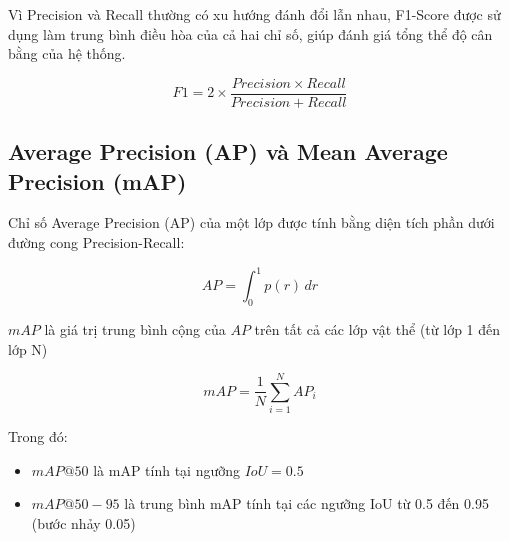 Vì Precision và Recall thường có xu hướng đánh đổi lẫn nhau, F1-Score được sử dụng làm trung bình điều hòa của cả hai chỉ số, giúp đánh giá tổng thể độ cân bằng của hệ thống.

\begin{equation}
	F1 = 2 \times \frac{Precision \times Recall} {Precision + Recall}
\end{equation}

\subsection{Average Precision (AP) và Mean Average Precision (mAP)}

Chỉ số Average Precision (AP) của một lớp được tính bằng diện tích phần dưới đường cong Precision-Recall:

\begin{equation}
	AP = \int_{0}^{1} p(r) \, dr
\end{equation}

$mAP$ là giá trị trung bình cộng của $AP$ trên tất cả các lớp vật thể (từ lớp 1 đến lớp N)

\begin{equation}
	mAP = \frac{1}{N} \sum_{i=1}^{N} AP_i
\end{equation}

Trong đó:
\begin{itemize}
	\item $mAP@50$ là mAP tính tại ngưỡng $IoU = 0.5$
	
	\item $mAP@50-95$ là trung bình mAP tính tại các ngưỡng IoU từ 0.5 đến 0.95 (bước nhảy 0.05)
\end{itemize}
